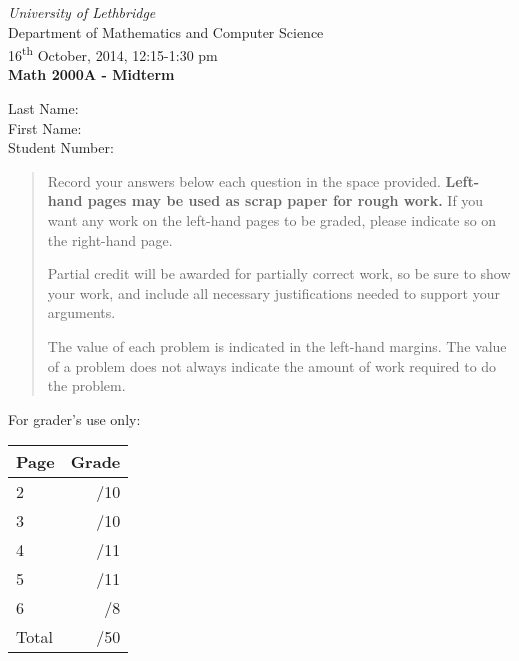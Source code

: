 \documentclass[12pt]{article}
\newcommand{\skipline}{\vspace{12pt}}
\begin{document}
\author{Instructor: Sean Fitzpatrick}
\thispagestyle{plain}
\begin{center}
\emph{University of Lethbridge}\\
Department of Mathematics and Computer Science\\
16\textsuperscript{th} October, 2014, 12:15-1:30 pm\\
{\bf Math 2000A - Midterm}\\
\end{center}
\skipline \skipline \skipline \noindent \skipline
Last Name:\underline{\hspace{350pt}}\\
\skipline
First Name:\underline{\hspace{348pt}}\\
\skipline
Student Number:\underline{\hspace{322pt}}\\


\vspace{0.5in}


\begin{quote}
 Record your answers below each question in the space provided.    {\bf Left-hand pages may be used as scrap paper for rough work.}  If you want any work on the left-hand pages to be graded, please indicate so on the right-hand page.
 
 \bigskip
 
Partial credit will be awarded for partially correct work, so be sure to show your work, and include all necessary justifications needed to support your arguments. 

The value of each problem is indicated in the left-hand margins. The value of a problem does not always indicate the amount of work required to do the problem.
\end{quote}


\vspace{0.5in}

For grader's use only:

\begin{table}[hbt]
\begin{center}
\begin{tabular}{|l|r|} \hline
Page&Grade\\
\hline \hline
\cline{1-2} 2 & \enspace\enspace\enspace\enspace\enspace\enspace/10\\
\cline{1-2} 3 & \enspace\enspace\enspace\enspace\enspace\enspace/10\\
\cline{1-2} 4 & \enspace\enspace\enspace\enspace\enspace\enspace/11\\
\cline{1-2} 5 & \enspace\enspace\enspace\enspace\enspace\enspace/11\\
\cline{1-2} 6 & \enspace\enspace\enspace\enspace\enspace\enspace/8\\
\cline{1-2} Total & \enspace\enspace\enspace\enspace\enspace\enspace/50\\
\hline
\end{tabular}

\skipline

\skipline

\skipline


\end{center}
\end{table}
\newpage
\end{document}
